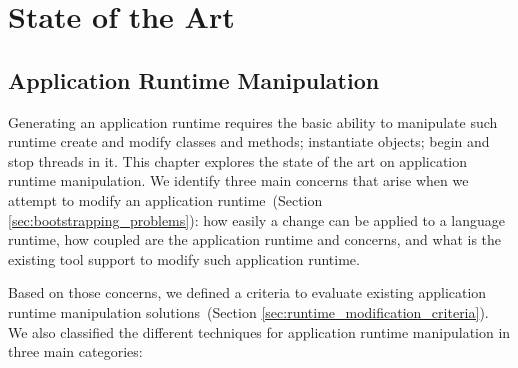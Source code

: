 
\part{State of the Art}



\chapter{Application Runtime Manipulation}
\minitoc

Generating an application runtime requires the basic ability to manipulate such runtime \eg create and modify classes and methods; instantiate objects; begin and stop threads in it. This chapter explores the state of the art on application runtime manipulation. We identify three main concerns that arise when we attempt to modify an application runtime~(Section \ref{sec:bootstrapping_problems}): how easily a change can be applied to a language runtime, how coupled are the application runtime and \VM concerns, and what is the existing tool support to modify such application runtime.

Based on those concerns, we defined a criteria to evaluate existing application runtime manipulation solutions~(Section \ref{sec:runtime_modification_criteria}). We also classified the different techniques for application runtime manipulation in three main categories:

